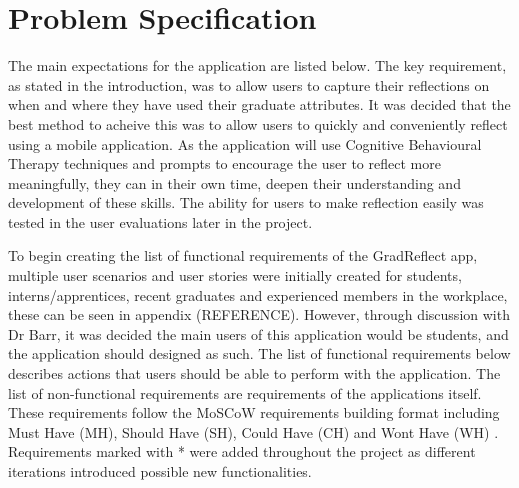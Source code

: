 \documentclass{l4proj}
\begin{document}
\section{Problem Specification}

The main expectations for the application are listed below. The key requirement, as stated in the introduction, was to allow users to capture their reflections on when and where they have used their graduate attributes. It was decided that the best method to acheive this was to allow users to quickly and conveniently reflect using a mobile application. As the application will use Cognitive Behavioural Therapy techniques and prompts to encourage the user to reflect more meaningfully, they can in their own time, deepen their understanding and development of these skills. The ability for users to make reflection easily was tested in the user evaluations later in the project. 

To begin creating the list of functional requirements of the GradReflect app, multiple user scenarios and user stories were initially created for students, interns/apprentices, recent graduates and experienced members in the workplace, these can be seen in appendix (REFERENCE). However, through discussion with Dr Barr, it was decided the main users of this application would be students, and the application should designed as such. The list of functional requirements below describes actions that users should be able to perform with the application. The list of non-functional requirements are requirements of the applications itself. These requirements follow the MoSCoW requirements building format including Must Have (MH), Should Have (SH), Could Have (CH) and Wont Have (WH) \citep{consortium_chapter_2014}. Requirements marked with * were added throughout the project as different iterations introduced possible new functionalities. 
\end{document}
